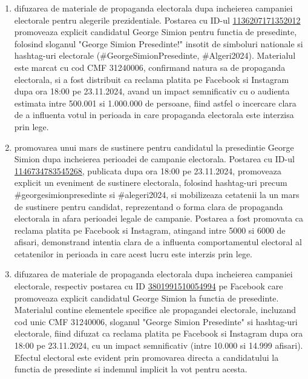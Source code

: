 \documentclass[a4paper,12pt]{article}
\begin{document}
\begin{enumerate}[leftmargin=*, label=\arabic*.)]
    \item difuzarea de materiale de propaganda electorala dupa incheierea campaniei electorale pentru alegerile prezidentiale. Postarea cu ID-ul \href{https://www.facebook.com/ads/library/?id=1136207171352012}{1136207171352012} promoveaza explicit candidatul George Simion pentru functia de presedinte, folosind sloganul "George Simion Presedinte!" insotit de simboluri nationale si hashtag-uri electorale (\#GeorgeSimionPresedinte, \#Algeri2024). Materialul este marcat cu cod CMF 31240006, confirmand natura sa de propaganda electorala, si a fost distribuit ca reclama platita pe Facebook si Instagram dupa ora 18:00 pe 23.11.2024, avand un impact semnificativ cu o audienta estimata intre 500.001 si 1.000.000 de persoane, fiind astfel o incercare clara de a influenta votul in perioada in care propaganda electorala este interzisa prin lege.
    \item promovarea unui mars de sustinere pentru candidatul la presedintie George Simion dupa incheierea perioadei de campanie electorala. Postarea cu ID-ul \href{https://www.facebook.com/ads/library/?id=1146734783545268}{1146734783545268}, publicata dupa ora 18:00 pe 23.11.2024, promoveaza explicit un eveniment de sustinere electorala, folosind hashtag-uri precum \#georgesimionpresedinte si \#alegeri2024, si mobilizeaza cetatenii la un mars de sustinere pentru candidat, reprezentand o forma clara de propaganda electorala in afara perioadei legale de campanie. Postarea a fost promovata ca reclama platita pe Facebook si Instagram, atingand intre 5000 si 6000 de afisari, demonstrand intentia clara de a influenta comportamentul electoral al cetatenilor in perioada in care acest lucru este interzis prin lege.
    \item difuzarea de materiale de propaganda electorala dupa incheierea campaniei electorale, respectiv postarea cu ID \href{https://www.facebook.com/ads/library/?id=3801991510054994}{3801991510054994} pe Facebook care promoveaza explicit candidatul George Simion la functia de presedinte. Materialul contine elementele specifice ale propagandei electorale, incluzand cod unic CMF 31240006, sloganul "George Simion Presedinte" si hashtag-uri electorale, fiind difuzat ca reclama platita pe Facebook si Instagram dupa ora 18:00 pe 23.11.2024, cu un impact semnificativ (intre 10.000 si 14.999 afisari). Efectul electoral este evident prin promovarea directa a candidatului la functia de presedinte si indemnul implicit la vot pentru acesta.

\end{enumerate}
\end{document}
